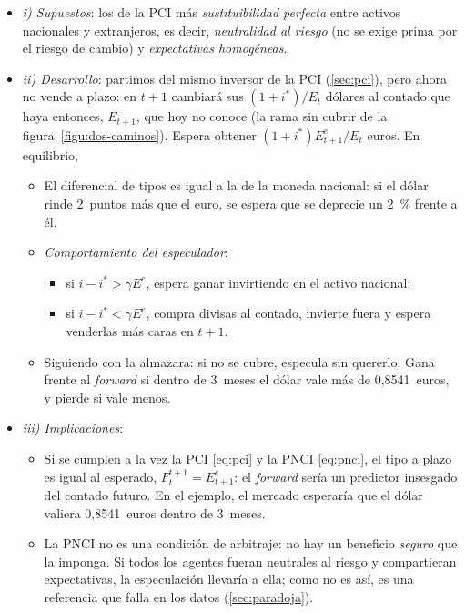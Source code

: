 \documentclass[11pt]{article}
\begin{document}
\begin{itemize}
\item \emph{i) Supuestos}: los de la PCI más \emph{sustituibilidad perfecta} entre activos nacionales y extranjeros, es decir, \emph{neutralidad al riesgo} (no se exige prima por el riesgo de cambio) y \emph{expectativas homogéneas}.
\item \emph{ii) Desarrollo}: partimos del mismo inversor de la PCI (\ref{sec:pci}), pero ahora no vende a plazo: en $t+1$ cambiará sus $(1+i^{*})/E_t$ dólares al contado que haya entonces, $E_{t+1}$, que hoy no conoce (la rama sin cubrir de la figura~\ref{figu:dos-caminos}). Espera obtener $(1+i^{*})E^e_{t+1}/E_t$ euros. En equilibrio,
  \begin{itemize}
  \item El diferencial de tipos es igual a la  de la moneda nacional: si el dólar rinde 2~puntos más que el euro, se espera que se deprecie un 2~\% frente a él.
  \item \emph{Comportamiento del especulador}:
    \begin{itemize}
    \item si $i-i^{*}>\gamma E^e$, espera ganar invirtiendo en el activo nacional;
    \item si $i-i^{*}<\gamma E^e$, compra divisas al contado, invierte fuera y espera venderlas más caras en $t+1$.
    \end{itemize}
  \item Siguiendo con la almazara: si no se cubre, especula sin quererlo. Gana frente al \emph{forward} si dentro de 3~meses el dólar vale más de 0,8541~euros, y pierde si vale menos.
  \end{itemize}
\item \emph{iii) Implicaciones}:
  \begin{itemize}
  \item Si se cumplen a la vez la PCI \eqref{eq:pci} y la PNCI \eqref{eq:pnci}, el tipo a plazo es igual al esperado, $F_t^{t+1}=E^e_{t+1}$: el \emph{forward} sería un predictor insesgado del contado futuro. En el ejemplo, el mercado esperaría que el dólar valiera 0,8541~euros dentro de 3~meses.
  \item La PNCI no es una condición de arbitraje: no hay un beneficio \emph{seguro} que la imponga. Si todos los agentes fueran neutrales al riesgo y compartieran expectativas, la especulación llevaría a ella; como no es así, es una referencia que falla en los datos (\ref{sec:paradoja}).
  \end{itemize}
\end{itemize}
\end{document}
